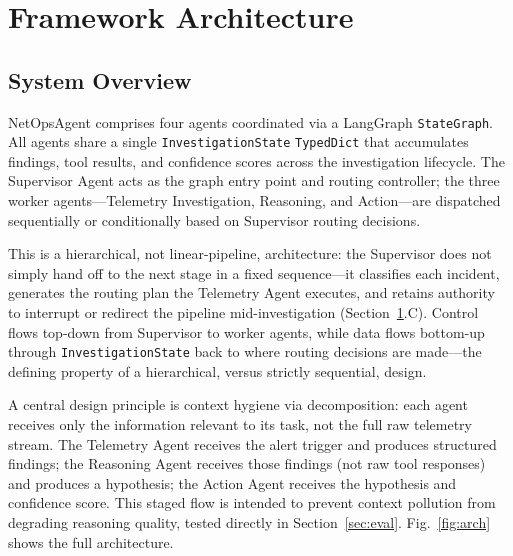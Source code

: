\documentclass[10pt,conference]{IEEEtran}
\begin{document}
\section{Framework Architecture}
\label{sec:arch}

\subsection{System Overview}
NetOpsAgent comprises four agents coordinated via a LangGraph
\texttt{StateGraph}. All agents share a single \texttt{InvestigationState}
\texttt{TypedDict} that accumulates findings, tool results, and confidence
scores across the investigation lifecycle. The Supervisor Agent acts as the
graph entry point and routing controller; the three worker
agents---Telemetry Investigation, Reasoning, and Action---are dispatched
sequentially or conditionally based on Supervisor routing decisions.

This is a hierarchical, not linear-pipeline, architecture: the Supervisor
does not simply hand off to the next stage in a fixed sequence---it
classifies each incident, generates the routing plan the Telemetry Agent
executes, and retains authority to interrupt or redirect the pipeline
mid-investigation (Section~\ref{sec:arch}.C). Control flows top-down from
Supervisor to worker agents, while data flows bottom-up through
\texttt{InvestigationState} back to where routing decisions are
made---the defining property of a hierarchical, versus strictly
sequential, design.

A central design principle is context hygiene via decomposition: each agent
receives only the information relevant to its task, not the full raw
telemetry stream. The Telemetry Agent receives the alert trigger and
produces structured findings; the Reasoning Agent receives those findings
(not raw tool responses) and produces a hypothesis; the Action Agent
receives the hypothesis and confidence score. This staged flow is intended
to prevent context pollution from degrading reasoning quality, tested
directly in Section~\ref{sec:eval}. Fig.~\ref{fig:arch} shows the full
architecture.
\end{document}
